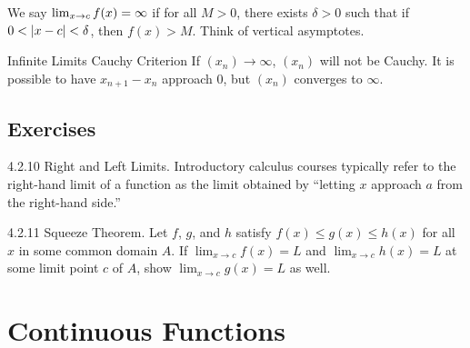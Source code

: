 We say \(\lim_{x \rightarrow c}f(x) = \infty\) if for all \(M > 0\), there exists \(\delta > 0\) such that if \(0 < \left|x - c\right| < \delta\), then \(f(x) > M\). Think of vertical asymptotes.


\begin{ntheorem}
    {Infinite Limits Cauchy Criterion} If \((x_n) \rightarrow \infty\), \((x_n)\) will not be Cauchy. It is possible to have \(x_{n+1} - x_n\) approach 0, but \((x_n)\) converges to \(\infty\).
\end{ntheorem}


\renewcommand{\theenumi}{\alph{enumi}}
\renewcommand{\labelenumi}{(\theenumi)}
\subsection{Exercises}

\begin{exercise}
    {4.2.10} Right and Left Limits. Introductory calculus courses typically refer to the right-hand limit of a function as the limit obtained by “letting \(x\) approach \(a\) from the right-hand side.”
\end{exercise}


\begin{exercise}
    {4.2.11} Squeeze Theorem. Let \(f\), \(g\), and \(h\) satisfy \(f(x) \leq g(x) \leq h(x)\) for all \(x\) in some common domain \(A\). If \(\lim_{x \to c} f(x) = L\) and \(\lim_{x \to c} h(x) = L\) at some limit point \(c\) of \(A\), show \(\lim_{x \to c} g(x) = L\) as well.
\end{exercise}

\sol{
}


\renewcommand{\theenumi}{\arabic{enumi}}
\renewcommand{\labelenumi}{\theenumi.}

\section{Continuous Functions}

